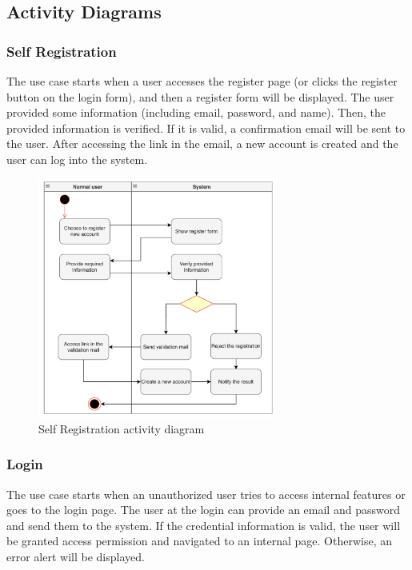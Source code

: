 \subsection{Activity Diagrams}

\subsubsection{Self Registration}

The use case starts when a user accesses the register page (or clicks the register button on the login form), and then a register form will be displayed. The user provided some information (including email, password, and name). Then,  the provided information is verified. If it is valid, a confirmation email will be sent to the user. After accessing the link in the email, a new account is created and the user can log into the system.

\begin{figure}[H]
  \centering
  \includegraphics[width=0.7\textwidth]{Figures/self_register.png}
  \caption{Self Registration activity diagram}
  \label{fig:self-registration}
\end{figure}


\subsubsection{Login}

The use case starts when an unauthorized user tries to access internal features or goes to the login page. The user at the login can provide an email and password and send them to the system. If the credential information is valid, the user will be granted access permission and navigated to an internal page. Otherwise, an error alert will be displayed.

